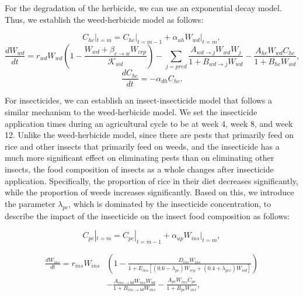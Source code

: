 \documentclass{HZNUMCM}
\begin{document}
        For the degradation of the herbicide, we can use an exponential decay model. Thus, we establish the weed-herbicide model as follows:
      
        \begin{equation}
        C_{hc}|_{t=m} = C_{hc}|_{t=m-1} + \alpha_{uh} W_{wd}|_{t=m},
        \end{equation}
        \begin{equation}
        \frac{dW_{wd}}{dt} = r_{wd}W_{wd} \left( 1 - \frac{W_{wd} + \beta_{c \rightarrow w} W_{crp}}{\mathscr{K}_{wd}} \right) - \sum_{j=pred}{\frac{A_{wd\rightarrow j} W_{wd} W_{j}}{1 + B_{wd\rightarrow j} W_{wd}}} - \frac{A_{hc} W_{wd} C_{hc}}{1 + B_{hc} W_{wd}},
        \end{equation}
        \begin{equation}
        \frac{dC_{hc}}{dt} = - \alpha_{dh} C_{hc}.
        \end{equation}
        
        For insecticides, we can establish an insect-insecticide model that follows a similar mechanism to the weed-herbicide model. 
        We set the insecticide application times during an agricultural cycle to be at week 4, week 8, and week 12. Unlike the weed-herbicide model, 
        since there are pests that primarily feed on rice and other insects that primarily feed on weeds, 
        and the insecticide has a much more significant effect on eliminating pests than on eliminating other insects, 
        the food composition of insects as a whole changes after insecticide application. Specifically, 
        the proportion of rice in their diet decreases significantly, while the proportion of weeds increases significantly. 
        Based on this, we introduce the parameter \( \lambda_{pc} \), which is dominated by the insecticide concentration, 
        to describe the impact of the insecticide on the insect food composition as follows:
        
        \begin{equation}
          C_{pc}|_{t=m} = C_{pc}|_{t=m-1} + \alpha_{up} W_{ins}|_{t=m}, 
        \end{equation}

        \begin{equation}
          \begin{split}
            \frac{dW_{ins}}{dt} = r_{ins} W_{ins} &\left( 1 - \frac{D_{ins} W_{ins}}{1 + E_{ins} \left[ (0.6 - \lambda_{pc}) W_{crp} + (0.4 + \lambda_{prc}) W_{wd} \right]} \right) \\
            &-\frac{A_{ins\rightarrow bd} W_{ins} W_{bd}}{1 + B_{ins\rightarrow bd} W_{ins}} - \frac{A_{pc} W_{ins} C_{pc}}{1 + B_{pc} W_{ins}},
          \end{split}
      \end{equation}
\end{document}
